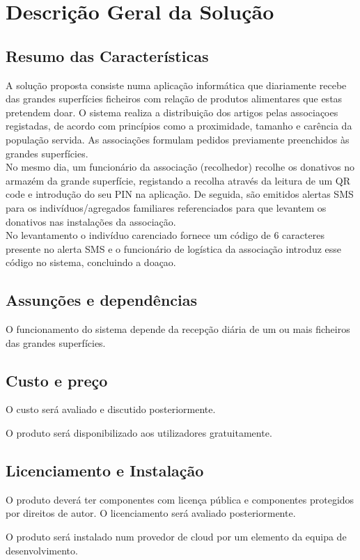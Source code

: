 \section{Descrição Geral da Solução}

\subsection{Resumo das Características}

A solução proposta consiste numa aplicação informática que diariamente recebe das grandes superfícies ficheiros com relação de produtos alimentares que estas pretendem doar. O sistema realiza a distribuição dos artigos pelas associaçoes registadas, de acordo com princípios como a proximidade, tamanho e carência da população servida. As associações formulam pedidos previamente preenchidos às grandes superfícies.\\
No mesmo dia, um funcionário da associação (recolhedor) recolhe os donativos no armazém da grande superfície, registando a recolha através da leitura de um QR code e introdução do seu PIN na aplicação. De seguida, são emitidos alertas SMS para os indivíduos/agregados familiares referenciados para que levantem os donativos nas instalações da associação.\\
No levantamento o indivíduo carenciado fornece um código de 6 caracteres presente no alerta SMS e o funcionário de logística da associação introduz esse código no sistema, concluindo a doaçao.\\

\subsection{Assunções e dependências}
O funcionamento do sistema depende da recepção diária de um ou mais ficheiros das grandes superfícies.\\

\subsection{Custo e preço}

O custo será avaliado e discutido posteriormente.

O produto será disponibilizado aos utilizadores gratuitamente.
\subsection{Licenciamento e Instalação}
O produto deverá ter componentes com licença pública e componentes protegidos por direitos de autor. O licenciamento será avaliado posteriormente.

O produto será instalado num provedor de cloud por um elemento da equipa de desenvolvimento.\\

\clearpage